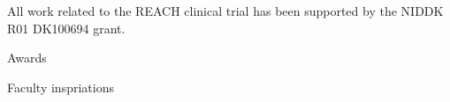 All work related to the REACH clinical trial has been supported by the NIDDK R01 DK100694 grant.

Awards

Faculty inspriations